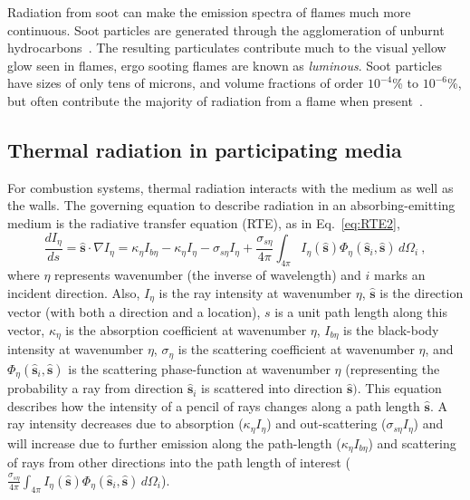 Radiation from soot can make the emission spectra of flames much more continuous.
Soot particles are generated through the agglomeration of unburnt hydrocarbons~\cite{Mueller2013LargeCombustor}. The resulting particulates contribute much to the visual yellow glow seen in flames, ergo sooting flames are known as \textit{luminous}. 
Soot particles have sizes of only tens of microns, and volume fractions of order $10^{-4}$\% to $10^{-6}$\%, but often contribute the majority of radiation from a flame when present~\cite{Modest2016RadiativeSystems}.

\subsection{Thermal radiation in participating media} \label{section:RTE}
For combustion systems, thermal radiation interacts with the medium as well as the walls. The governing equation to describe radiation in an absorbing-emitting medium is the radiative transfer equation (RTE), as in Eq.~\ref{eq:RTE2},
\begin{equation}
    \frac{dI_\eta{}}{ds} = \hat{\textbf{s}} \cdot \nabla{I_\eta{}} = \kappa{}_\eta{}I_{b\eta{}}-\kappa{}_\eta{}I_\eta{}-\sigma{}_{s\eta{}}I_\eta{}+\frac{\sigma{}_{s\eta{}}}{4\pi}\int_{4\pi{}}{I_\eta{}(\hat{\textbf{s}})\Phi_\eta{}(\hat{\textbf{s}}_i,\hat{\textbf{s}})}\,d\Omega{}_i \ ,
    \label{eq:RTE2}
\end{equation}
where $\eta{}$ represents wavenumber (the inverse of wavelength) and $i$ marks an incident direction. Also, $I_\eta{}$ is the ray intensity at wavenumber $\eta$, $\hat{\textbf{s}}$ is the direction vector (with both a direction and a location), $s$ is a unit path length along this vector, $\kappa{}_\eta$ is the absorption coefficient at wavenumber $\eta{}$, $I_{b\eta}$ is the black-body intensity at wavenumber $\eta$, $\sigma{}_\eta{}$ is the scattering coefficient at wavenumber $\eta{}$, and $\Phi{}_\eta{}(\hat{\textbf{s}}_i,\hat{\textbf{s}})$ is the scattering phase-function at wavenumber $\eta{}$ (representing the probability a ray from direction $\hat{\textbf{s}}_i$ is scattered into direction $\hat{\textbf{s}})$.
This equation describes how the intensity of a pencil of rays changes along a path length $\hat{\textbf{s}}$. A ray intensity decreases due to absorption ($\kappa{}_\eta{}I_\eta{}$) and out-scattering ($\sigma{}_{s\eta{}}I_\eta{}$) and will increase due to further emission along the path-length ($\kappa{}_\eta{}I_{b\eta{}}$) and scattering of rays from other directions into the path length of interest ($\frac{\sigma{}_{s\eta{}}}{4\pi}\int_{4\pi{}}{I_\eta{}(\hat{\textbf{s}})\Phi_\eta{}(\hat{\textbf{s}}_i,\hat{\textbf{s}})}\,d\Omega{}_i$). 

